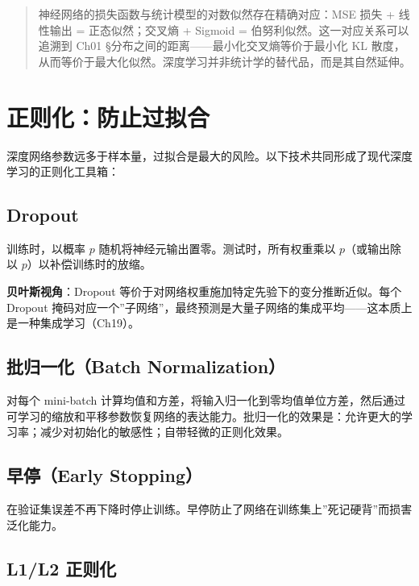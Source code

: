 \documentclass[
]{book}
\begin{document}
\begin{quote}
神经网络的损失函数与统计模型的对数似然存在精确对应：MSE 损失 + 线性输出 = 正态似然；交叉熵 + Sigmoid = 伯努利似然。这一对应关系可以追溯到 Ch01 §分布之间的距离------最小化交叉熵等价于最小化 KL 散度，从而等价于最大化似然。深度学习并非统计学的替代品，而是其自然延伸。
\end{quote}

\section{正则化：防止过拟合}\label{ux6b63ux5219ux5316ux9632ux6b62ux8fc7ux62dfux5408}

深度网络参数远多于样本量，过拟合是最大的风险。以下技术共同形成了现代深度学习的正则化工具箱：

\subsection{Dropout}\label{dropout}

训练时，以概率 \(p\) 随机将神经元输出置零。测试时，所有权重乘以 \(p\)（或输出除以 \(p\)）以补偿训练时的放缩。

\textbf{贝叶斯视角}：Dropout 等价于对网络权重施加特定先验下的变分推断近似。每个 Dropout 掩码对应一个''子网络''，最终预测是大量子网络的集成平均------这本质上是一种集成学习（Ch19）。

\subsection{批归一化（Batch Normalization）}\label{ux6279ux5f52ux4e00ux5316batch-normalization}

对每个 mini-batch 计算均值和方差，将输入归一化到零均值单位方差，然后通过可学习的缩放和平移参数恢复网络的表达能力。批归一化的效果是：允许更大的学习率；减少对初始化的敏感性；自带轻微的正则化效果。

\subsection{早停（Early Stopping）}\label{ux65e9ux505cearly-stopping}

在验证集误差不再下降时停止训练。早停防止了网络在训练集上''死记硬背''而损害泛化能力。

\subsection{L1/L2 正则化}\label{l1l2-ux6b63ux5219ux5316}
\end{document}
